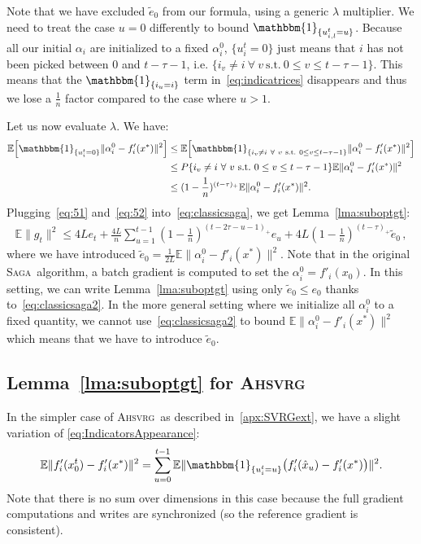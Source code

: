 \documentclass[twoside, 11pt]{article}
\newcommand{\overlap}{\tau}
\newcommand{\lipschitz}{L}
\newcommand{\E}{\mathbb{E}}
\newcommand{\ind}{\mathbbm{1}}
\newcommand{\SAGA}{\textsc{Saga}}
\newcommand{\AHSVRG}{\textsc{Ahsvrg}}
\begin{document}
Note that we have excluded $\tilde e_0$ from our formula, using a generic $\lambda$ multiplier.
We need to treat the case $u=0$ differently to bound $\ind_{\{u_{i,l}^t = u\}}$.
Because all our initial $\alpha_i$ are initialized to a fixed $\alpha_i^0$, $\{u_i^t = 0\}$ just means that $i$ has not been picked between $0$ and $t-\overlap -1$, i.e. $\{i_v \neq i\ \forall\ v\ \text{s.t.}\ 0 \leq v \leq t - \overlap -1\}$.
This means that the $\ind_{\{i_u=i\}}$ term in~\eqref{eq:indicatrices} disappears and thus we lose a $\frac{1}{n}$ factor compared to the case where $u>1$.

Let us now evaluate $\lambda$.
We have:
\begin{align}\label{eq:52}
\E \Big[\ind_{\{u_i^t = 0\}} \|\alpha_i^0-f'_i(x^*)\|^2 \Big]
&\leq \E \Big[\ind_{\{i_v \neq i\ \forall\ v\ \text{s.t.}\ 0 \leq v \leq t - \overlap -1\}} \|\alpha_i^0-f'_i(x^*)\|^2 \Big]
\nonumber \\
&\leq P\{i_v \neq i\ \forall\ v\ \text{s.t.}\ 0 \leq v \leq t - \overlap -1\} \E \|\alpha_i^0-f'_i(x^*)\|^2
\nonumber \\
&\leq (1 - \frac{1}{n})^{(t-\overlap)_+} \E \|\alpha_i^0-f'_i(x^*)\|^2 .
\end{align}
Plugging~\eqref{eq:51} and~\eqref{eq:52} into~\eqref{eq:classicsaga}, we get Lemma~\ref{lma:suboptgt}:
\begin{align}\label{eq:53}
\E\|g_t\|^2
\leq 4\lipschitz e_t
	+ \frac{4\lipschitz}{n} \sum_{u=1}^{t-1} (1 - \frac{1}{n})^{(t-2\overlap-u -1)_+} e_u
	+ 4\lipschitz (1 - \frac{1}{n})^{(t-\overlap)_+} \tilde e_0 \,  ,
\end{align}
where we have introduced $\tilde e_0 = \frac{1}{2\lipschitz} \E\|\alpha_i^0 - f'_i(x^*)\|^2$.
Note that in the original \SAGA\ algorithm, a batch gradient is computed to set the $\alpha_i^0 = f'_i(x_0)$.
In this setting, we can write Lemma~\ref{lma:suboptgt} using only $\tilde e_0 \leq e_0$ thanks to~\eqref{eq:classicsaga2}.
In the more general setting where we initialize all $\alpha_i^0$ to a fixed quantity, we cannot use~\eqref{eq:classicsaga2} to bound $\E\|\alpha_i^0 - f'_i(x^*)\|^2$ which means that we have to introduce $\tilde e_0$.

\subsection{Lemma~\ref{lma:suboptgt} for \AHSVRG}\label{apxB:ahsvrg}
In the simpler case of \AHSVRG\ as described in~\ref{apx:SVRGext}, we have a slight variation of \eqref{eq:IndicatorsAppearance}:
\begin{equation}
\E \|f'_i(x_0^t) - f'_i(x^*)\|^2
=
\sum_{u=0}^{t-1} \E \| \ind_{\{u_i^t = u\}} \big(f'_i(\hat x_u) - f'_i(x^*)\big) \|^2
\label{eq:IndicatorsAppearanceSVRG}.
\end{equation}
Note that there is no sum over dimensions in this case because the full gradient computations and writes are synchronized (so the reference gradient is consistent).
\end{document}
